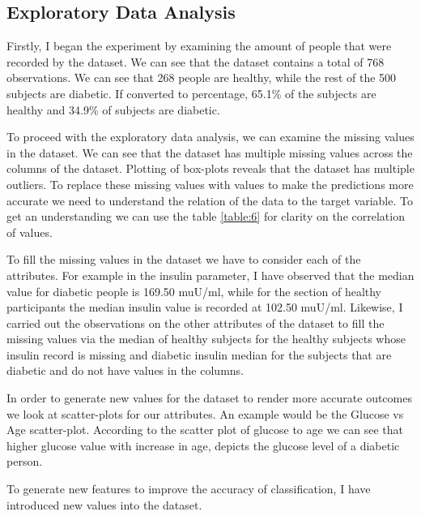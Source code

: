 \documentclass[12pt]{article}
\begin{document}
\subsection{Exploratory Data Analysis}
Firstly, I began the experiment by examining the amount of people that were recorded by the dataset. We can see that the dataset contains a total of 768 observations. We can see that 268 people are healthy, while the rest of the 500 subjects are diabetic. If converted to percentage, 65.1\% of the subjects are healthy and 34.9\% of subjects are diabetic.

To proceed with the exploratory data analysis, we can examine the missing values in the dataset. We can see that the dataset has multiple missing values across the columns of the dataset. Plotting of box-plots reveals that the dataset has multiple outliers. To replace these missing values with values to make the predictions more accurate we need to understand the relation of the data to the target variable. To get an understanding we can use the table \ref{table:6} for clarity on the correlation of values.

To fill the missing values in the dataset we have to consider each of the attributes. For example in the insulin parameter, I have observed that the median value for diabetic people is 169.50 muU/ml, while for the section of healthy participants the median insulin value is recorded at 102.50 muU/ml. Likewise, I carried out the observations on the other attributes of the dataset to fill the missing values via the median of healthy subjects for the healthy subjects whose insulin record is missing and diabetic insulin median for the subjects that are diabetic and do not have values in the columns.

In order to generate new values for the dataset to render more accurate outcomes we look at scatter-plots for our attributes. An example would be the Glucose vs Age scatter-plot. According to the scatter plot of glucose to age we can see that higher glucose value with increase in age, depicts the glucose level of a diabetic person.

To generate new features to improve the accuracy of classification, I have introduced new values into the dataset.
\end{document}
